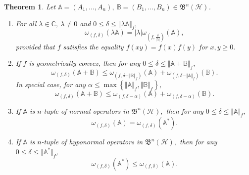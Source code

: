\documentclass[12pt]{article}
\newtheorem{theorem}{Theorem}
\begin{document}
\begin{theorem} \label{thm-fdnumradntupop}
\label{thm1}
Let $\mathbb{A} = (A_{1}, \ldots, A_{n}), \ \mathbb{B} = (B_{1}, \ldots, B_{n}) \in \mathfrak{B}^{n}(\mathcal{H})$.
\begin{enumerate}[label=\upshape{\arabic*.}, ref=\upshape{\arabic*}, labelindent=5pt, leftmargin=*,ref=\upshape{\arabic*}]
\item \label{item1-thm-fdnumradntupop} For all $ \lambda \in \mathbb{C}, \ \lambda\neq 0 $ and $ 0\leq \delta \leq \Vert \lambda \mathbb{A} \Vert_{f}, $
\[
\omega_{(f,\delta)}(\lambda \mathbb{A} )= \vert \lambda \vert \omega_{\left(f, \frac{\delta}{\vert \lambda \vert}\right) } ( \mathbb{A} ),
\]
provided that $ f $ satisfies the equality $ f(xy)=f(x)f(y) $ for $ x,y\geq 0. $

\item \label{item2-thm-fdnumradntupop} If $ f $ is geometrically convex, then for any $ 0\leq \delta \leq \Vert \mathbb{A} + \mathbb{B} \Vert_{f} ,$
\[
\omega_{(f,\delta)}(\mathbb{A} + \mathbb{B} )\leq \omega_{\left( f, \delta- \Vert \mathbb{B} \Vert_{f}\right) } (\mathbb{A})+ \omega_{\left( f, \delta- \Vert \mathbb{A} \Vert_{f}\right) }(\mathbb{B}) .
\]
In special case, for any $ \alpha \leq \max \left\lbrace \Vert \mathbb{A} \Vert_{f}, \Vert \mathbb{B} \Vert_{f} \right\rbrace, $
\[
\omega_{(f,\delta)}(\mathbb{A} + \mathbb{B} )\leq \omega_{\left( f, \delta-\alpha\right) }(\mathbb{A}) + \omega_{\left( f, \delta-\alpha\right) } (\mathbb{B}).
\]
\item \label{item3-thm-fdnumradntupop} If $\mathbb{A}$ is $n$-tuple of normal operators in $ \mathfrak{B}^{n}(\mathcal{H}),$ then for any $ 0\leq \delta \leq  \Vert \mathbb{A} \Vert_{f} $,
\[
\omega_{(f,\delta)}(\mathbb{A}) = \omega_{(f,\delta)}(\mathbb{A}^{*}).
\]
\item \label{item4-thm-fdnumradntupop} If $\mathbb{A}$ is $n$-tuple of hyponormal operators in $ \mathfrak{B}^{n}(\mathcal{H}) ,$ then for any $ 0\leq \delta \leq  \Vert \mathbb{A}^{*} \Vert_{f}$,
\[
\omega_{(f,\delta)}(\mathbb{A}^{*}) \leq \omega_{(f,\delta)}(\mathbb{A}).
\]
\end{enumerate}
\end{theorem}
\end{document}
